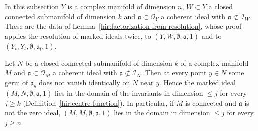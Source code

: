 In this subsection \(Y\) is a complex manifold of dimension \(n\), \(W\subset Y\) a closed connected submanifold of dimension \(k\) and \(\mathfrak a\subset\mathcal O_Y\) a
coherent ideal with \(\mathfrak a\not\subset\mathcal I_W\). These are the data of Lemma~\ref{hir:factorization-from-resolution}, whose proof applies the resolution of
marked ideals twice, to \((Y,W,\emptyset,\mathfrak a,1)\) and to \((Y_t,Y_t,\emptyset,\mathfrak a_t,1)\).

\begin{lemma}
\label{mc:factorization-domain}
\leanok
Let \(N\) be a closed connected submanifold of dimension \(k\) of a complex manifold \(M\) and \(\mathfrak a\subset\mathcal O_M\) a coherent ideal with
\(\mathfrak a\not\subset\mathcal I_N\). Then at every point \(y\in N\) some germ of \(\mathfrak a_y\) does not vanish identically on \(N\) near \(y\). Hence the marked ideal
\((M,N,\emptyset,\mathfrak a,1)\) lies in the domain of the invariants in dimension \(\le j\) for every \(j\ge k\) (Definition~\ref{hir:centre-function}). In particular, if \(M\)
is connected and \(\mathfrak a\) is not the zero ideal, \((M,M,\emptyset,\mathfrak a,1)\) lies in the domain in dimension \(\le j\) for every \(j\ge n\).
\end{lemma}
